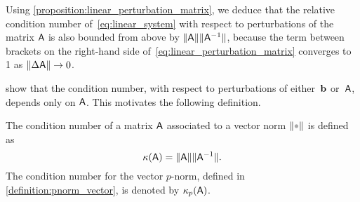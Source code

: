 Using \cref{proposition:linear_perturbation_matrix},
we deduce that the relative condition number of~\eqref{eq:linear_system} with respect to perturbations of the matrix $\mathsf A$ is also bounded from above by $\lVert\mathsf A\rVert \lVert\mathsf A^{-1}\rVert$,
because the term between brackets on the right-hand side of~\eqref{eq:linear_perturbation_matrix} converges to 1 as $\lVert\Delta \mathsf A\rVert \to 0$.


 show that
the condition number, with respect to perturbations of either~$\mathbf b$ or~$\mathsf A$,
depends only on $\mathsf A$.
This motivates the following definition.
\begin{definition}
    The condition number of a matrix $\mathsf A$ associated to a vector norm $\norm{\placeholder}$ is defined as
    \[
        \kappa(\mathsf A) = \lVert\mathsf A\rVert \lVert\mathsf A^{-1}\rVert.
    \]
    The condition number for the vector $p$-norm,
    defined in \cref{definition:pnorm_vector},
    is denoted by $\kappa_p(\mathsf A)$.
\end{definition}
